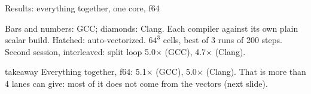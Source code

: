 \documentclass[aspectratio=169,10pt,t]{beamer}
\newcommand{\sx}[1]{#1\ensuremath{\times}} %
\newcommand{\takeaway}[1]{\par\vfill
  \begin{beamercolorbox}[wd=\textwidth,sep=4pt,rounded=true]{takeaway}
    \small #1
  \end{beamercolorbox}}
\begin{document}
\begin{frame}{Results: everything together, one core, f64}
  \vspace{1mm}
  \centering

  \vspace{0.5mm}
  {\scriptsize\color{psgray}Bars and numbers: GCC; diamonds: Clang. Each compiler against its own plain
  scalar build. Hatched: auto-vectorized. $64^3$ cells, best of 3 runs of 200 steps. Second session,
  interleaved: split loop \sx{5.0} (GCC), \sx{4.7} (Clang).\par}
  \takeaway{Everything together, f64: \sx{5.1} (GCC), \sx{5.0} (Clang). That is more than 4 lanes can
    give: most of it does not come from the vectors (next slide).}
\end{frame}
\end{document}
